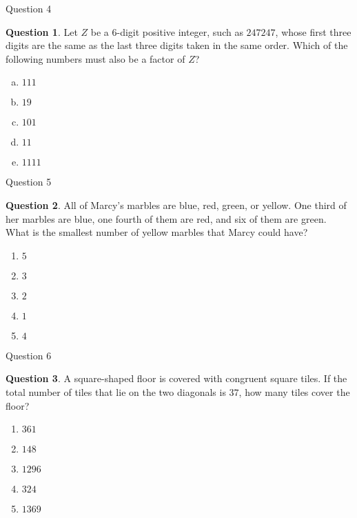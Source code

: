 \documentclass[handout]{beamer}
\theoremstyle{definition}
\newtheorem{quest}{Question}
\begin{document}
\begin{frame}{Question 4}
\begin{quest}
Let $Z$ be a $6$-digit positive integer, such as $247247$, whose first three digits are the same as the last three digits taken in the same order.
Which of the following numbers must also be a factor of $Z$?
\begin{enumerate}[(a)]
\item $111$
\item $19$
\item $101$
\item $11$
\item $1111$
\end{enumerate}
\end{quest}

\end{frame}

\begin{frame}{Question 5}
\begin{quest}
All of Marcy's marbles are blue, red, green, or yellow.
One third of her marbles are blue, one fourth of them are red, and six of them are green.
What is the smallest number of yellow marbles that Marcy could have?
\begin{enumerate}[a]
\item $5$
\item $3$
\item $2$
\item $1$
\item $4$
\end{enumerate}
\end{quest}

\end{frame}

\begin{frame}{Question 6}
\begin{quest}
A square-shaped floor is covered with congruent square tiles.
If the total number of tiles that lie on the two diagonals is $37$, how many tiles cover the floor?
\begin{enumerate}[a]
\item $361$
\item $148$
\item $1296$
\item $324$
\item $1369$
\end{enumerate}
\end{quest}

\end{frame}
\end{document}
